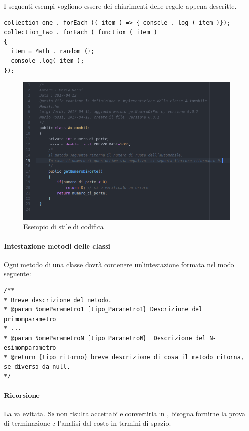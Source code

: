 I seguenti esempi vogliono essere dei chiarimenti delle regole appena descritte.
\begin{lstlisting}
collection_one . forEach (( item ) => { console . log ( item )});
collection_two . forEach ( function ( item )
{
  item = Math . random ();
  console .log( item );
});
\end{lstlisting}
\begin{figure}[h]
	\centering
	\includegraphics[scale=0.45]{img/esempioStileCodifica.png}
	\caption{Esempio di stile di codifica}
\end{figure}
 \newpage
 \paragraph{Intestazione metodi delle classi}\label{intestazione}
 Ogni metodo di una classe dovrà contenere un'intestazione formata nel modo seguente:
 \begin{lstlisting}
/**
* Breve descrizione del metodo.
* @param NomeParametro1 {tipo_Parametro1} Descrizione del primomparametro
* ...
* @param NomeParametroN {tipo_ParametroN}  Descrizione del N-esimomparametro
* @return {tipo_ritorno} breve descrizione di cosa il metodo ritorna, se diverso da null.
*/

 \end{lstlisting}
 
 \paragraph{Ricorsione}
 La  va evitata. Se non risulta accettabile convertirla in , bisogna fornirne la prova di terminazione e l'analisi del costo in termini di spazio.

